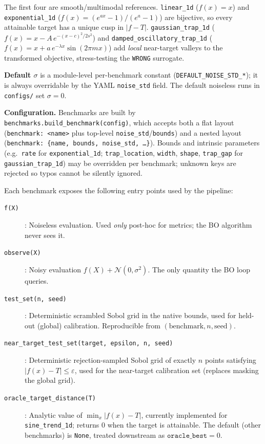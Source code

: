 \documentclass[11pt]{article}
\newcommand{\WRONG}{\texttt{WRONG}}
\begin{document}
The first four are smooth/multimodal references. \texttt{linear\_1d}
($f(x)=x$) and \texttt{exponential\_1d}
($f(x)=(e^{ax}-1)/(e^a-1)$) are bijective, so every attainable target has a
unique cusp in $|f-T|$. \texttt{gaussian\_trap\_1d}
($f(x)=x-A\,e^{-(x-c)^2/2s^2}$) and \texttt{damped\_oscillatory\_trap\_1d}
($f(x)=x+a\,e^{-\lambda x}\sin(2\pi m x)$) add \emph{local} near-target valleys
to the transformed objective, stress-testing the \WRONG{} surrogate.

\textbf{Default $\sigma$} is a module-level per-benchmark constant
(\texttt{DEFAULT\_NOISE\_STD\_*}); it is always overridable by the YAML
\texttt{noise\_std} field. The default noiseless runs in \texttt{configs/} set
$\sigma = 0$.

\textbf{Configuration.} Benchmarks are built by
\texttt{benchmarks.build\_benchmark(config)}, which accepts both a flat layout
(\texttt{benchmark: <name>} plus top-level \texttt{noise\_std}/\texttt{bounds})
and a nested layout (\texttt{benchmark: \{name, bounds, noise\_std, \dots\}}).
Bounds and intrinsic parameters (e.g.\ \texttt{rate} for
\texttt{exponential\_1d}; \texttt{trap\_location}, \texttt{width},
\texttt{shape}, \texttt{trap\_gap} for \texttt{gaussian\_trap\_1d}) may be
overridden per benchmark; unknown keys are rejected so typos cannot be silently
ignored.

Each benchmark exposes the following entry points used by the pipeline:
\begin{description}
  \item[\texttt{f(X)}] : Noiseless evaluation. Used \emph{only} post-hoc for metrics; the BO algorithm never sees it.
  \item[\texttt{observe(X)}] : Noisy evaluation $f(X) + \mathcal{N}(0,\sigma^2)$. The only quantity the BO loop queries.
  \item[\texttt{test\_set(n, seed)}] : Deterministic scrambled Sobol grid in the native bounds, used for held-out (global) calibration. Reproducible from
        $(\text{benchmark}, n, \text{seed})$.
  \item[\texttt{near\_target\_test\_set(target, epsilon, n, seed)}] : Deterministic rejection-sampled Sobol grid of exactly $n$ points satisfying $|f(x)-T|\le\varepsilon$, used for the near-target calibration set (replaces masking the global grid).
  \item[\texttt{oracle\_target\_distance(T)}] : Analytic value of $\min_x|f(x)-T|$, currently implemented for \texttt{sine\_trend\_1d}; returns $0$ when the target is attainable. The default (other benchmarks) is \texttt{None}, treated downstream as $\texttt{oracle\_best}=0$.
\end{description}
 
\end{document}
